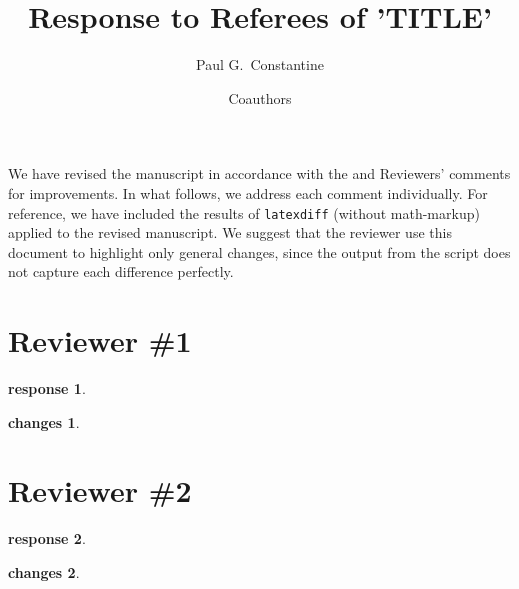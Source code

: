 \documentclass[11pt]{article}
\title{Response to Referees of 'TITLE'}
\author{Paul G.~Constantine \and Coauthors}
\newtheorem{comment}{comment}[section]
\theoremstyle{nonumberplain}
\newtheorem{response}{response}
\newtheorem{changes}{changes}
\begin{document}
\maketitle

We have revised the manuscript in accordance with the and Reviewers' comments for improvements. In what follows, we address each comment individually. For reference, we have included the results of \texttt{latexdiff} (without math-markup) applied to the revised manuscript. We suggest that the reviewer use this document to highlight only general changes, since the output from the script does not capture each difference perfectly.

\section{Reviewer \#1}

\begin{comment} 
\end{comment}
\begin{response}
\end{response}
\begin{changes}
\end{changes}

\section{Reviewer \#2}

\begin{comment} 
\end{comment}
\begin{response}
\end{response}
\begin{changes}
\end{changes}
\end{document}
